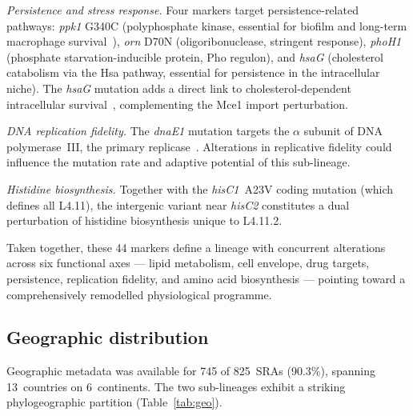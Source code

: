 \documentclass[11pt,a4paper]{article}
\newcommand{\lignee}[1]{\textsf{#1}}
\begin{document}
\textit{Persistence and stress response.}  Four markers target
persistence-related pathways:
\textit{ppk1} G340C (polyphosphate kinase, essential for biofilm
and long-term macrophage survival~\cite{tiwari2019,singh2013}),
\textit{orn} D70N (oligoribonuclease, stringent response),
\textit{phoH1} (phosphate starvation-inducible protein, Pho regulon),
and \textit{hsaG} (cholesterol catabolism via the Hsa pathway,
essential for persistence in the intracellular niche).
The \textit{hsaG} mutation adds a direct link to cholesterol-dependent
intracellular survival~\cite{miner2009}, complementing the Mce1 import perturbation.

\textit{DNA replication fidelity.}  The \textit{dnaE1} mutation
targets the $\alpha$ subunit of DNA polymerase~III, the primary
replicase~\cite{rock2015}.  Alterations in replicative fidelity could influence
the mutation rate and adaptive potential of this sub-lineage.

\textit{Histidine biosynthesis.}  Together with the \textit{hisC1}~A23V
coding mutation (which defines all \lignee{L4.11}), the intergenic
variant near \textit{hisC2} constitutes a dual perturbation of
histidine biosynthesis unique to \lignee{L4.11.2}.

Taken together, these 44 markers define a lineage with concurrent
alterations across six functional axes --- lipid metabolism, cell envelope,
drug targets, persistence, replication fidelity, and amino acid
biosynthesis --- pointing toward a comprehensively remodelled
physiological programme.

\subsection{Geographic distribution}

Geographic metadata was available for 745 of 825~SRAs (90.3\%), spanning
13~countries on 6~continents.  The two sub-lineages exhibit a striking
phylogeographic partition (Table~\ref{tab:geo}).
\end{document}
